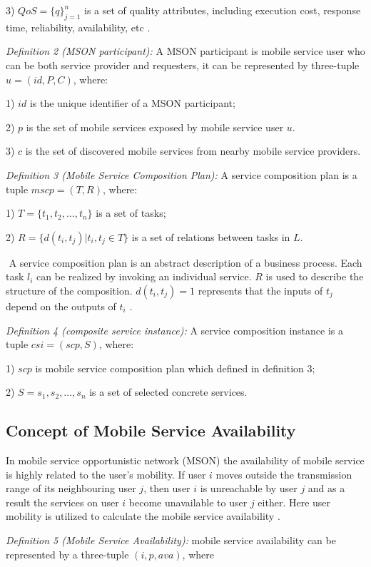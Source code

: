 \documentclass[10pt,journal,compsoc]{IEEEtran}
\begin{document}
​3) $QoS = \{q\}^n_{j=1}$ is a set of quality attributes, including execution cost, response time, reliability, availability, etc \cite{Deng2016-2}.

\textit{Definition 2 (MSON participant):} A MSON participant is mobile service user who can be both service provider and requesters, it can be represented by three-tuple $u = (id, P, C)$, where:

​1) $id$ is the unique identifier of a MSON participant;

​2) $p$ is the set of mobile services exposed by mobile service user $u$.

​3) $c$ is the set of discovered mobile services from nearby mobile service providers.

\textit{Definition 3 (Mobile Service Composition Plan):} A service composition plan is a tuple $mscp = (T, R)$, where:

​1) $T = \{t_1,t_2,…,t_n\}$ is a set of tasks;

​2) $R = \{d(t_i,t_j)|t_i,t_j \in T\}$ is a set of relations between tasks in $L$.

​	A service composition plan is an abstract description of a business process. Each task $l_i$ can be realized by invoking an individual service. $R$ is used to describe the structure of the composition. $d(t_i, t_j) = 1$ represents that the inputs of $t_j$ depend on the outputs of $t_i$ \cite{Deng2016-2}.

\textit{Definition 4 (composite service instance):} A service composition instance is a tuple $csi = (scp, S)$, where:

​1) $scp$ is mobile service composition plan which defined in definition 3;

​2) $S = {s_1, s_2,…,s_n}$ is a set of selected concrete services.

\subsection{Concept of Mobile Service Availability}
In mobile service opportunistic network (MSON) the availability of mobile service is highly related to the user’s mobility. If user $i$ moves outside the transmission range of its neighbouring user $j$, then user $i$ is unreachable by user $j$ and as a result the services on user $i$ become unavailable to user $j$ either. Here user mobility is utilized to calculate the mobile service availability \cite{Yang2010}.

\textit{Definition 5 (Mobile Service Availability):} mobile service availability can be represented by a three-tuple $(i, p, ava) $, where
\end{document}
